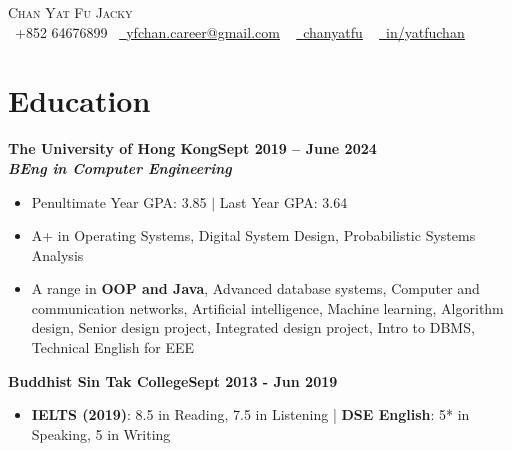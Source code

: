 \documentclass[a4paper,10pt]{article}
\begin{document}
\begin{center}
  {\Huge \scshape Chan Yat Fu Jacky} \\ \vspace{5pt}
  \small \raisebox{-0.1\height}\faPhone\ +852 64676899~ \href{mailto:yfchan.career@gmail.com}{\raisebox{-0.2\height}\faEnvelope\  \underline{yfchan.career@gmail.com}} ~
  \href{https://github.com/chanyatfu}{\raisebox{-0.2\height}\faGithub\ \underline{chanyatfu}} ~
  \href{https://hk.linkedin.com/in/yatfuchan}{\raisebox{-0.2\height}\faLinkedin\ \underline{in/yatfuchan}}  ~
  \vspace{-3pt}
\end{center}

\newcommand*{\bb}[2]{{\small\bfseries#1\hfill{\small#2}}\\}
\newcommand*{\cc}[2]{{\bfseries\textit{\small#1}\hfill\textit{\small#2}}\\}
\newenvironment{tightitemize}{\begin{itemize}[leftmargin=2em,topsep=1pt,partopsep=1pt,noitemsep]\small}{\end{itemize}\vspace*{2pt}}

\section{Education}

\bb{The University of Hong Kong}{Sept 2019 -- June 2024}
\cc{BEng in Computer Engineering}{}
\begin{tightitemize}
  \item Penultimate Year GPA: 3.85 $|$ Last Year GPA: 3.64
  \item A+ in Operating Systems, Digital System Design, Probabilistic Systems Analysis
  \item A range in \textbf{OOP and Java}, Advanced database systems, Computer and communication networks, Artificial intelligence, Machine learning, Algorithm design, Senior design project, Integrated design project, Intro to DBMS, Technical English for EEE
\end{tightitemize}

\bb{Buddhist Sin Tak College}{Sept 2013 - Jun 2019}
\begin{tightitemize}
  \item \textbf{IELTS (2019)}: 8.5 in Reading, 7.5 in Listening | \textbf{DSE English}: 5* in Speaking, 5 in Writing
\end{tightitemize}
\end{document}
